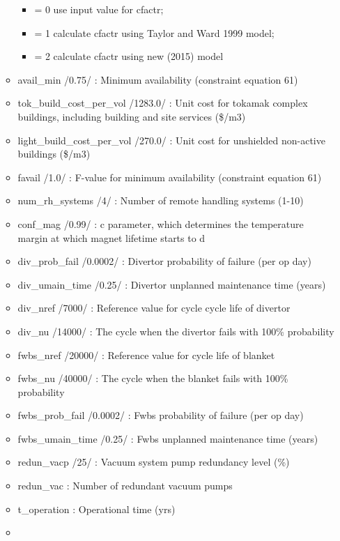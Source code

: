 \documentclass[
]{article}
\providecommand{\tightlist}{%
  \setlength{\itemsep}{0pt}\setlength{\parskip}{0pt}}
\begin{document}
\begin{itemize}
\begin{itemize}
    \begin{itemize}
    \tightlist
    \item
      = 0 use input value for cfactr;
    \item
      = 1 calculate cfactr using Taylor and Ward 1999 model;
    \item
      = 2 calculate cfactr using new (2015) model
    \end{itemize}
  \item
    avail\_min /0.75/ : Minimum availability (constraint equation 61)
  \item
    tok\_build\_cost\_per\_vol /1283.0/ : Unit cost for tokamak complex
    buildings, including building and site services (\$/m3)
  \item
    light\_build\_cost\_per\_vol /270.0/ : Unit cost for unshielded
    non-active buildings (\$/m3)
  \item
    favail /1.0/ : F-value for minimum availability (constraint equation
    61)
  \item
    num\_rh\_systems /4/ : Number of remote handling systems (1-10)
  \item
    conf\_mag /0.99/ : c parameter, which determines the temperature
    margin at which magnet lifetime starts to d
  \item
    div\_prob\_fail /0.0002/ : Divertor probability of failure (per op
    day)
  \item
    div\_umain\_time /0.25/ : Divertor unplanned maintenance time
    (years)
  \item
    div\_nref /7000/ : Reference value for cycle cycle life of divertor
  \item
    div\_nu /14000/ : The cycle when the divertor fails with 100\%
    probability
  \item
    fwbs\_nref /20000/ : Reference value for cycle life of blanket
  \item
    fwbs\_nu /40000/ : The cycle when the blanket fails with 100\%
    probability
  \item
    fwbs\_prob\_fail /0.0002/ : Fwbs probability of failure (per op day)
  \item
    fwbs\_umain\_time /0.25/ : Fwbs unplanned maintenance time (years)
  \item
    redun\_vacp /25/ : Vacuum system pump redundancy level (\%)
  \item
    redun\_vac : Number of redundant vacuum pumps
  \item
    t\_operation : Operational time (yrs)
  \item

\end{itemize}
\end{itemize}
\end{document}
